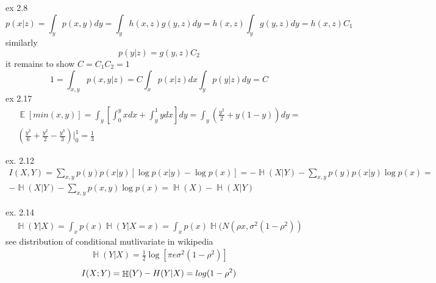 \documentclass[12pt]{article}
\DeclareMathOperator{\E}{\mathbb{E}}
\DeclareMathOperator{\HH}{\mathbb{H}}
\begin{document}
ex 2.8
\begin{equation}
p(x|z) = \int_{y} p(x,y)dy = \int_{y}h(x,z)g(y,z)dy = h(x,z)\int_{y}g(y,z)dy = h(x,z)C_1
\end{equation}
similarly
\begin{equation}
p(y|z) = g(y,z)C_2
\end{equation}
it remains to show $C = C_1C_2 = 1$
\begin{equation}
1 = \int_{x,y}p(x,y|z) = C\int_{x}p(x|z)dx\int_{y}p(y|z)dy = C 
\end{equation}
ex 2.17
\begin{equation}
\begin{split}
\displaystyle 
\E[min(x,y)] = \int_{y}[\int_{0}^{y}xdx + \int_{y}^{1}ydx]dy = \int_{y}(\frac{y^2}{2} + y(1-y))dy =\\ 
(\frac{y^3}{6} + \frac{y^2}{2} - \frac{y^3}{3}) \biggr\rvert_{0}^{1} = \frac{1}{3}
\end{split}
\end{equation}

ex. 2.12
\begin{equation}
\begin{split}
\displaystyle 
I(X,Y) = \sum_{x,y}p(y)p(x|y)[\log p(x|y) - \log p(x)] = -\HH(X|Y) - \sum_{x,y}p(y)p(x|y)\log p(x) = \\ -\HH(X|Y) - \sum_{x,y}p(x,y)\log p(x) = \HH(X) - \HH(X|Y)
\end{split}
\end{equation}

ex. 2.14
\begin{equation}
\begin{split}
\displaystyle 
\HH(Y|X) = \int_{x}p(x)\HH(Y|X=x) = \int_{x}p(x)\HH(N(\rho x,\sigma^2(1-\rho^2))
\end{split}
\end{equation}
see distribution of conditional mutlivariate in wikipedia
\begin{equation}
\begin{split}
\displaystyle 
\HH(Y|X) = \frac{1}{2}\log[\pi e\sigma^2(1-\rho^2)]
\end{split}
\end{equation}
$$I(X;Y) = \HH(Y) - \\H(Y|X)= log(1-\rho^2)$$
\end{document}
